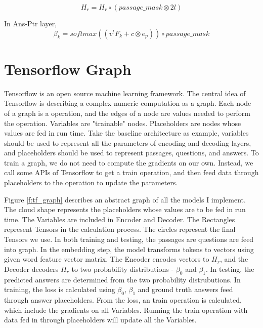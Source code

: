 \documentclass[modernstyle,12pt]{sjsuthesis}
\theoremstyle{definition}
\begin{document}
$$H_r = H_r \circ (passage\_mask \otimes 2l)$$

In Ans-Ptr layer,
$$\beta _k = softmax( (v^tF_k + c \otimes e_p) ) \circ passage\_mask$$


\section{Tensorflow Graph}
Tensorflow is an open source machine learning framework. The central idea of Tensorflow is describing a complex numeric computation as a graph. Each node of a graph is a operation, and the edges of a node are values needed to perform the operation. Variables are "trainable" nodes. Placeholders are nodes whose values are fed in run time. Take the baseline architecture as example, variables should be used to represent all the parameters of encoding and decoding layers, and placeholders should be used to represent passages, questions, and answers. To train a graph, we do not need to compute the gradients on our own. Instead, we call some APIs of Tensorflow to get a train operation, and then feed data through placeholders to the operation to update the parameters.



Figure \ref{f:tf_graph} describes an abstract graph of all the models I implement. The cloud shape represents the placeholders whose values are to be fed in run time. The Variables are included in Encoder and Decoder. The Rectangles represent Tensors in the calculation process. The circles represent the final Tensors we use. In both training and testing, the passages are questions are feed into graph. In the embedding step, the model transforms tokens to vectors using given word feature vector matrix. The Encoder encodes vectors to $H_r$, and the Decoder decoders $H_r$ to two probability distributions - $\beta _0$ and $\beta _1$. In testing, the predicted answers are determined from the two probability distrubutions. In training, the loss is calculated using $\beta _0$, $\beta _1$ and ground truth answers feed through answer placeholders. From the loss, an train operation is calculated, which include the gradients on all Variables. Running the train operation with data fed in through placeholders will update all the Variables.
\end{document}
